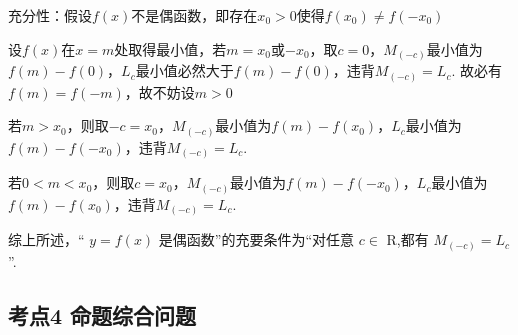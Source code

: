 \begin{enumerate}
\begin{jieda}
\begin{enumerate}
            充分性：假设$f(x)$不是偶函数，即存在$x_0 > 0$使得$f(x_0) \neq f(-x_0)$

            设$f(x)$在$x = m$处取得最小值，若$m = x_0$或$-x_0$，取$c = 0$，${M}_{\left( -c\right) }$最小值为$f(m)-f(0)$，$L_c$最小值必然大于$f(m) - f(0)$，违背${M}_{\left( -c\right) } = {L}_{c}$. 故必有$f(m) = f(-m)$，故不妨设$m > 0$

            若$m > x_0$，则取$-c = x_0$，${M}_{\left( -c\right) }$最小值为$f(m)-f(x_0)$，$L_c$最小值为$f(m) - f(-x_0)$，违背${M}_{\left( -c\right) } = {L}_{c}$.

            若$0 < m < x_0$，则取$c = x_0$，${M}_{\left( -c\right) }$最小值为$f(m)-f(-x_0)$，$L_c$最小值为$f(m) - f(x_0)$，违背${M}_{\left( -c\right) } = {L}_{c}$.

            综上所述，“ $y = f\left( x\right)$ 是偶函数”的充要条件为“对任意 $c \in$ R,都有 ${M}_{\left( -c\right) } = {L}_{c}$ ”.
        \end{enumerate}
    \end{jieda}
\end{enumerate}

\subsection*{考点4 命题综合问题}

